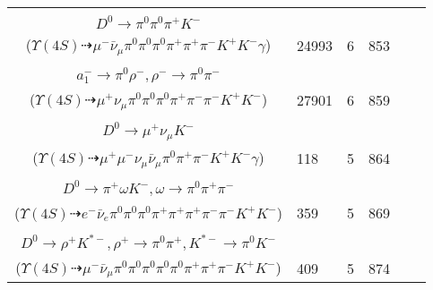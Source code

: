 \documentclass[landscape]{article}
\newcounter{rownumbers}
\newcommand\rn{\stepcounter{rownumbers}\arabic{rownumbers}}
\newcommand{\EOLP}{\\ \hline} %
\newcommand{\topoTags}[1]{#1} %
\begin{document}
\begin{longtable}{clcccc}
\rn & \makecell[l]{ $ 
\Upsilon(4S) \rightarrow B^{+} B^{-} ,
B^{+} \rightarrow \rho^{+} \bar{D}^{0} ,
B^{-} \rightarrow \mu^{-} \bar{\nu}_{\mu} D^{*0} ,
\rho^{+} \rightarrow \pi^{0} \pi^{+} ,
\bar{D}^{0} \rightarrow \pi^{-} K^{+} ,
D^{*0} \rightarrow D^{0} \gamma ,
$ \\ $
D^{0} \rightarrow \pi^{0} \pi^{0} \pi^{+} K^{-} 
$ \\ ($
\Upsilon(4S) \dashrightarrow \mu^{-} \bar{\nu}_{\mu} \pi^{0} \pi^{0} \pi^{0} \pi^{+} \pi^{+} \pi^{-} K^{+} K^{-} \gamma 
$) } & \topoTags{24993 & }6 & 853 \EOLP

\rn & \makecell[l]{ $ 
\Upsilon(4S) \rightarrow B^{+} B^{-} ,
B^{+} \rightarrow \mu^{+} \nu_{\mu} \bar{D}^{0} ,
B^{-} \rightarrow \rho^{-} D^{0} ,
\bar{D}^{0} \rightarrow K^{+} a_{1}^{-} ,
\rho^{-} \rightarrow \pi^{0} \pi^{-} ,
D^{0} \rightarrow \pi^{+} K^{-} ,
$ \\ $
a_{1}^{-} \rightarrow \pi^{0} \rho^{-} ,
\rho^{-} \rightarrow \pi^{0} \pi^{-} 
$ \\ ($
\Upsilon(4S) \dashrightarrow \mu^{+} \nu_{\mu} \pi^{0} \pi^{0} \pi^{0} \pi^{+} \pi^{-} \pi^{-} K^{+} K^{-} 
$) } & \topoTags{27901 & }6 & 859 \EOLP

\rn & \makecell[l]{ $ 
\Upsilon(4S) \rightarrow B^{+} B^{-} ,
B^{+} \rightarrow \rho^{+} \bar{D}^{0} ,
B^{-} \rightarrow \mu^{-} \bar{\nu}_{\mu} D^{*0} ,
\rho^{+} \rightarrow \pi^{0} \pi^{+} ,
\bar{D}^{0} \rightarrow \pi^{-} K^{+} ,
D^{*0} \rightarrow D^{0} \gamma ,
$ \\ $
D^{0} \rightarrow \mu^{+} \nu_{\mu} K^{-} 
$ \\ ($
\Upsilon(4S) \dashrightarrow \mu^{+} \mu^{-} \nu_{\mu} \bar{\nu}_{\mu} \pi^{0} \pi^{+} \pi^{-} K^{+} K^{-} \gamma 
$) } & \topoTags{118 & }5 & 864 \EOLP

\rn & \makecell[l]{ $ 
\Upsilon(4S) \rightarrow B^{+} B^{-} ,
B^{+} \rightarrow \rho^{+} \bar{D}^{0} ,
B^{-} \rightarrow e^{-} \bar{\nu}_{e} D^{*0} ,
\rho^{+} \rightarrow \pi^{0} \pi^{+} ,
\bar{D}^{0} \rightarrow \pi^{-} K^{+} ,
D^{*0} \rightarrow \pi^{0} D^{0} ,
$ \\ $
D^{0} \rightarrow \pi^{+} \omega K^{-} ,
\omega \rightarrow \pi^{0} \pi^{+} \pi^{-} 
$ \\ ($
\Upsilon(4S) \dashrightarrow e^{-} \bar{\nu}_{e} \pi^{0} \pi^{0} \pi^{0} \pi^{+} \pi^{+} \pi^{+} \pi^{-} \pi^{-} K^{+} K^{-} 
$) } & \topoTags{359 & }5 & 869 \EOLP

\rn & \makecell[l]{ $ 
\Upsilon(4S) \rightarrow B^{+} B^{-} ,
B^{+} \rightarrow \rho^{+} \bar{D}^{0} ,
B^{-} \rightarrow \mu^{-} \bar{\nu}_{\mu} D^{*0} ,
\rho^{+} \rightarrow \pi^{0} \pi^{+} ,
\bar{D}^{0} \rightarrow \pi^{0} \pi^{-} K^{+} ,
D^{*0} \rightarrow \pi^{0} D^{0} ,
$ \\ $
D^{0} \rightarrow \rho^{+} K^{*-} ,
\rho^{+} \rightarrow \pi^{0} \pi^{+} ,
K^{*-} \rightarrow \pi^{0} K^{-} 
$ \\ ($
\Upsilon(4S) \dashrightarrow \mu^{-} \bar{\nu}_{\mu} \pi^{0} \pi^{0} \pi^{0} \pi^{0} \pi^{0} \pi^{+} \pi^{+} \pi^{-} K^{+} K^{-} 
$) } & \topoTags{409 & }5 & 874 \EOLP


\end{longtable}
\end{document}
